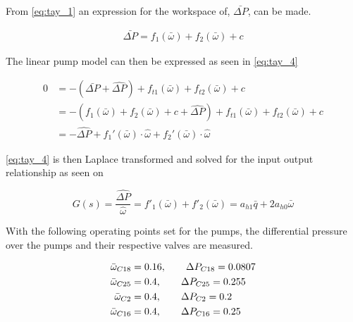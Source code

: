 From \eqref{eq:tay_1} an expression for the workspace of, $\bar{\Delta P}$, can be made.

\begin{equation}
\begin{split}
\bar{\Delta P} = f_{1}(\bar{\omega}) + f_{2}(\bar{\omega}) + c
\end{split}
\label{eq:tay_3}
\end{equation}

The linear pump model can then be expressed as seen in \eqref{eq:tay_4}

\begin{equation}
\begin{split}
0 &= -(\bar{\Delta P} + \hat{\Delta P}) + f_{t1}(\bar{\omega}) + f_{t2}(\bar{\omega}) + c\\
  &= -(f_{1}(\bar{\omega}) + f_{2}(\bar{\omega}) + c + \hat{\Delta P}) + f_{t1}(\bar{\omega}) + f_{t2}(\bar{\omega}) + c \\ 
  &= -\hat{\Delta P} + f_1'(\bar{\omega})\cdot\hat{\omega} + f_2'(\bar{\omega})\cdot\hat{\omega}
\end{split}
\label{eq:tay_4}
\end{equation}

\eqref{eq:tay_4} is then Laplace transformed and solved for the input output relationship as seen on 

\begin{equation}
G(s) = \frac{\hat{\Delta P}}{\hat{\omega}} = f'_1(\bar{\omega}) + f'_2(\bar{\omega}) = a_{h1}\bar{q} + 2a_{h0}\bar{\omega}
\label{eq:lin_pump_simon}
\end{equation}

With the following operating points set for the pumps, the differential pressure over the pumps and their respective valves are measured. 

\begin{equation}
\centering
	\begin{split}
	\bar{\omega}_{C18} &= 0.16,\hspace{20pt} \Delta P_{C18} = 0.0807 \\
	\bar{\omega}_{C25} &= 0.4,\hspace{20pt} \Delta P_{C25} = 0.255  \\
	\bar{\omega}_{C2}  &= 0.4,\hspace{20pt} \Delta P_{C2} = 0.2 \\
	\bar{\omega}_{C16} &= 0.4,\hspace{20pt} \Delta P_{C16} =0.25 
	\end{split}
\end{equation}


